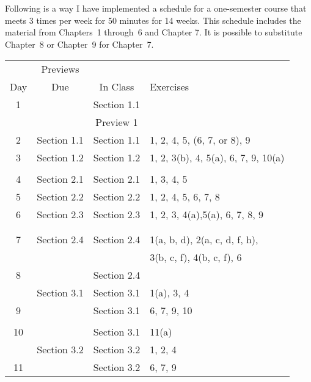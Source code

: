 Following is a way I have implemented a schedule for a one-semester course that meets 3 times per week for 50 minutes for 14 weeks.  This schedule includes the material from Chapters~1 through~6 and Chapter 7.  It is possible to substitute Chapter~8 or Chapter~9 for Chapter~7.

\begin{center}
\begin{tabular}[h]{| c | c | c | l |} \hline
     &  Previews &            &            \\
 Day &  Due      &  In Class  &  Exercises \\  \hline
  1  &           &  Section 1.1 &            \\  
     &           &  Preview 1   &            \\ \hline
  2  &  Section 1.1  &  Section 1.1  &  1, 2, 4, 5, (6, 7, or 8), 9  \\ \hline
  3  &  Section 1.2  &  Section 1.2  &  1, 2, 3(b), 4, 5(a), 6, 7, 9, 10(a)\\ \hline
     &               &               &               \\ \hline
  4  &  Section 2.1  &  Section 2.1  &  1, 3, 4, 5  \\ \hline
  5  &  Section 2.2  &  Section 2.2  &  1, 2, 4, 5, 6, 7, 8  \\ \hline
  6  &  Section 2.3  &  Section 2.3  &  1, 2, 3, 4(a),5(a), 6, 7, 8, 9 \\
     &               &               &                 \\ \hline
     &               &               &                 \\ \hline
  7  &  Section 2.4  &  Section 2.4  &  1(a, b, d), 2(a, c, d, f, h), \\
     &               &               &  3(b, c, f), 4(b, c, f), 6 \\ \hline
  8  &               &  Section 2.4  &  \\
     &  Section 3.1  &  Section 3.1  &  1(a), 3, 4  \\ \hline
  9  &               &  Section 3.1  &  6, 7, 9, 10  \\ \hline
     &               &               &  \\ \hline
 10  &               &  Section 3.1  &  11(a)  \\
     &  Section 3.2  &  Section 3.2  &  1, 2, 4 \\ \hline
 11  &               &  Section 3.2  &  6, 7, 9  \\ \hline

\end{tabular}
\end{center}

